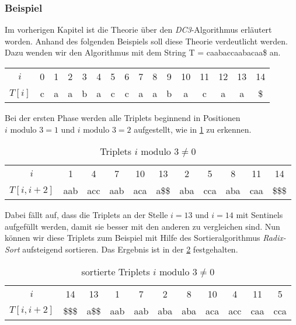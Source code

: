 \subsubsection{Beispiel}
\label{dc3:algorithmus:beispiel}


Im vorherigen Kapitel ist die Theorie über den \emph{DC3}-Algorithmus erläutert worden. Anhand des folgenden Beispiels soll diese Theorie verdeutlicht werden. Dazu wenden wir den Algorithmus mit dem String T = caabaccaabacaa\$ an.

\begin{table}[H]
	\centering
	\begin{tabular}{c| c c c c c c c c c c c c c c c}
		$i$ & 0 & 1 & 2 & 3 & 4 & 5 & 6 & 7 & 8 & 9 & 10 & 11 & 12 & 13 & 14 \\
		$T[i]$ & c & a & a & b & a & c & c & a & a & b & a & c & a & a & \$
	\end{tabular}
\end{table}

Bei der ersten Phase werden alle Triplets beginnend in Positionen\\$i \text{ modulo } 3 = 1$ und $i \text{ modulo } 3 = 2$ aufgestellt, wie in \cref{tab:unsortierteTriplets} zu erkennen.

\begin{table}[H]
	\centering
	\begin{tabular}{c| c c c c c ||  c c c c c }
		$i$ & 1 & 4 & 7 & 10 & 13 & 2 & 5 & 8 & 11 & 14\\
		$T[i, i+2]$ & aab & acc & aab & aca & a\$\$ & aba & cca & aba & caa & \$\$\$
	\end{tabular}
	\caption{Triplets $i \text{ modulo } 3 \neq 0$}
	\label{tab:unsortierteTriplets}
\end{table}

Dabei fällt auf, dass die Triplets an der Stelle $i = 13$ und $i = 14$ mit Sentinels aufgefüllt werden, damit sie besser mit den anderen zu vergleichen sind. Nun können wir diese Triplets zum Beispiel mit Hilfe des Sortieralgorithmus \emph{Radix-Sort} aufsteigend sortieren. Das Ergebnis ist in der \cref{tab:sortierteTriplets} festgehalten.

\begin{table}[H]
	\centering
	\begin{tabular}{c| c c c c c c c c c c}
		$i$ & 14 & 13 & 1 & 7 & 2 & 8 & 10 & 4 & 11 & 5\\
		$T[i, i+2]$ & \$\$\$ & a\$\$ & aab & aab & aba & aba & aca & acc & caa & cca 
	\end{tabular}
	\caption{sortierte Triplets $i \text{ modulo } 3 \neq 0$}
	\label{tab:sortierteTriplets}
\end{table}

